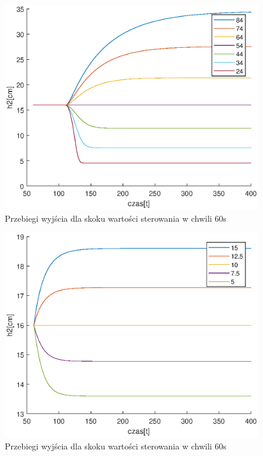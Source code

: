 		\begin{figure}
			\includegraphics[width=0.9\linewidth]{plots/z1_model_u.eps}
			\caption{Przebiegi wyjścia dla skoku wartości sterowania w chwili 60s}
			\label{rys:model_u}
		\end{figure}
		\begin{figure}
			\includegraphics[width=0.9\linewidth]{plots/z1_model_z.eps}
			\caption{Przebiegi wyjścia dla skoku wartości sterowania w chwili 60s}
			\label{rys:model_z}
		\end{figure}
		\newpage

